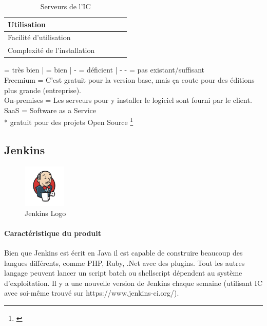 \begin{landscape}
\begin{table}[H]
\begin{tabular}{lp{4cm}p{4cm}p{4cm}p{4cm}}
			\rowcolor{GrayRow}\textbf{Utilisation} &  &  &  &  \\ \midrule[0.16em]
			Facilité d'utilisation & \checkmark & \checkmark & \checkmark\checkmark & \checkmark\checkmark \\ \midrule
			Complexité de l'installation & \checkmark & \checkmark & \checkmark\checkmark &  \checkmark\checkmark\\
			\bottomrule[0.16em]
		\end{tabular}
	\caption{Serveurs de l'IC}
	\label{tab:serveurs_eval}
\end{table}
\checkmark\checkmark = très bien | \checkmark = bien | - = déficient | - - = pas existant/suffisant \\
Freemium = C'est gratuit pour la version base, mais ça coute pour des éditions plus grande (entreprise).\\
On-premises = Les serveurs pour y installer le logiciel sont fourni par le client.\\
SaaS = Software as a Service \\
* gratuit pour des projets Open Source
\footnote{\citep{jenkinsplugins} \citep{teamcityenv} \citep{tfsversioncontrol}}


\end{landscape}
\newpage

\subsection{Jenkins}
\begin{figure}
  \begin{center}
    \includegraphics[width=0.18\textwidth]{bilder/JENKINS}
  \end{center}
  \caption{Jenkins Logo}
\end{figure}
\paragraph{Caractéristique du produit} Bien que Jenkins est écrit en Java il est capable de construire beaucoup des langues différents, comme PHP, Ruby, .Net avec des plugins. Tout les autres langage peuvent lancer un script batch ou shellscript dépendent au système d'exploitation. Il y a une nouvelle version de Jenkins chaque semaine (utilisant IC avec soi-même trouvé sur https://www.jenkins-ci.org/).


